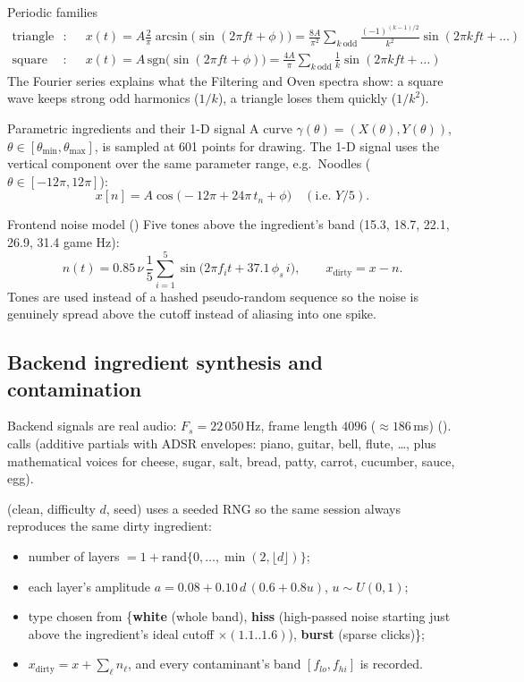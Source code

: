 \documentclass[11pt,a4paper]{article}
\begin{document}
\begin{mathbox}{Periodic families}
\begin{align*}
\text{triangle (Cheese)}:&\quad x(t)=A\tfrac{2}{\pi}\arcsin\bigl(\sin(2\pi ft+\phi)\bigr)
  = \tfrac{8A}{\pi^2}\sum_{k\ \text{odd}}\tfrac{(-1)^{(k-1)/2}}{k^2}\sin(2\pi kft+\dots)\\
\text{square (Sugar, Salt)}:&\quad x(t)=A\,\mathrm{sgn}\bigl(\sin(2\pi ft+\phi)\bigr)
  = \tfrac{4A}{\pi}\sum_{k\ \text{odd}}\tfrac{1}{k}\sin(2\pi kft+\dots)
\end{align*}
The Fourier series explains what the Filtering and Oven spectra show: a square wave keeps
strong odd harmonics ($1/k$), a triangle loses them quickly ($1/k^2$).
\end{mathbox}

\begin{mathbox}{Parametric ingredients and their 1-D signal}
A curve $\gamma(\theta)=(X(\theta),Y(\theta))$, $\theta\in[\theta_{\min},\theta_{\max}]$, is
sampled at 601 points for drawing. The 1-D signal uses the vertical component over the
same parameter range, e.g.\ Noodles ($\theta\in[-12\pi,12\pi]$):
\[
x[n]=A\cos\bigl(-12\pi+24\pi\,t_n+\phi\bigr)\quad(\text{i.e. }Y/5).
\]
\end{mathbox}

\begin{mathbox}{Frontend noise model ()}
Five tones above the ingredient's band (15.3, 18.7, 22.1, 26.9, 31.4 game Hz):
\[
n(t)=0.85\,\nu\,\frac{1}{5}\sum_{i=1}^{5}\sin\bigl(2\pi f_i t+37.1\,\phi_s\,i\bigr),
\qquad x_{\text{dirty}}=x-n .
\]
Tones are used instead of a hashed pseudo-random sequence so the noise is genuinely spread
above the cutoff instead of aliasing into one spike.
\end{mathbox}

\subsection{Backend ingredient synthesis and contamination}
Backend signals are real audio: $F_s=22\,050$\,Hz, frame length $4096$ ($\approx186$\,ms)
().  calls  (additive
partials with ADSR envelopes: piano, guitar, bell, flute, \dots, plus mathematical voices for
cheese, sugar, salt, bread, patty, carrot, cucumber, sauce, egg).

(clean, difficulty $d$, seed) uses a seeded RNG so the same session
always reproduces the same dirty ingredient:
\begin{itemize}
\item number of layers $=1+\text{rand}\{0,\dots,\min(2,\lfloor d\rfloor)\}$;
\item each layer's amplitude $a=0.08+0.10\,d\,(0.6+0.8u)$, $u\sim U(0,1)$;
\item type chosen from \{\textbf{white} (whole band), \textbf{hiss} (high-passed noise starting
  just above the ingredient's ideal cutoff $\times(1.1..1.6)$), \textbf{burst} (sparse clicks)\};
\item $x_{\text{dirty}}=x+\sum_\ell n_\ell$, and every contaminant's band $[f_{lo},f_{hi}]$ is recorded.
\end{itemize}
\end{document}

